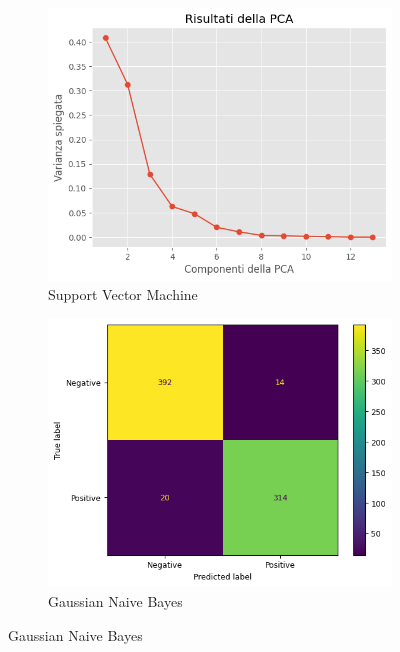 \begin{figure}[!ht]
    \centering
    \begin{subfigure}{0.45\textwidth}
        \centering
        \includegraphics[width=\textwidth]{img/analisi/pcaVarianza.png}
        \caption{Support Vector Machine}
        \label{fig:matrice_di_confusione_per_SVM_pca}
    \end{subfigure}
    \hfill
    \begin{subfigure}{.45\textwidth}
        \centering
        \includegraphics[width=\textwidth]{img/gnb/confusion_matrix_pca.png}
        \caption{Gaussian Naive Bayes}
        \label{fig:matrice_di_confusione_per_GNB_pca}

\end{subfigure}
\end{figure}

